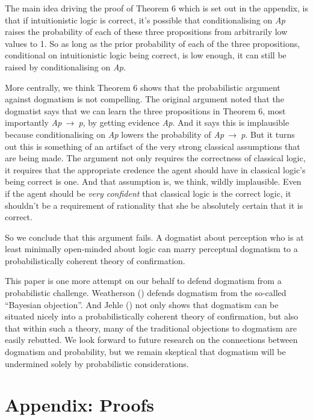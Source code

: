 \documentclass[
  11pt,
  letterpaper,
  DIV=11,
  numbers=noendperiod,
  twoside]{scrartcl}
\begin{document}
The main idea driving the proof of Theorem 6 which is set out in the
appendix, is that if intuitionistic logic is correct, it's possible that
conditionalising on \emph{Ap} raises the probability of each of these
three propositions from arbitrarily low values to 1. So as long as the
prior probability of each of the three propositions, conditional on
intuitionistic logic being correct, is low enough, it can still be
raised by conditionalising on \emph{Ap}.

More centrally, we think Theorem 6 shows that the probabilistic argument
against dogmatism is not compelling. The original argument noted that
the dogmatist says that we can learn the three propositions in Theorem
6, most importantly \emph{Ap}~→~\emph{p}, by getting evidence \emph{Ap}.
And it says this is implausible because conditionalising on \emph{Ap}
lowers the probability of \emph{Ap}~→~\emph{p}. But it turns out this is
something of an artifact of the very strong classical assumptions that
are being made. The argument not only requires the correctness of
classical logic, it requires that the appropriate credence the agent
should have in classical logic's being correct is one. And that
assumption is, we think, wildly implausible. Even if the agent should be
\emph{very confident} that classical logic is the correct logic, it
shouldn't be a requirement of rationality that she be absolutely certain
that it is correct.

So we conclude that this argument fails. A dogmatist about perception
who is at least minimally open-minded about logic can marry perceptual
dogmatism to a probabilistically coherent theory of confirmation.

This paper is one more attempt on our behalf to defend dogmatism from a
probabilistic challenge. Weatherson
() defends dogmatism from the
so-called ``Bayesian objection''. And Jehle
() not only shows that dogmatism can be
situated nicely into a probabilistically coherent theory of
confirmation, but also that within such a theory, many of the
traditional objections to dogmatism are easily rebutted. We look forward
to future research on the connections between dogmatism and probability,
but we remain skeptical that dogmatism will be undermined solely by
probabilistic considerations.

\section*{Appendix: Proofs}\label{appendix-proofs}
\end{document}
